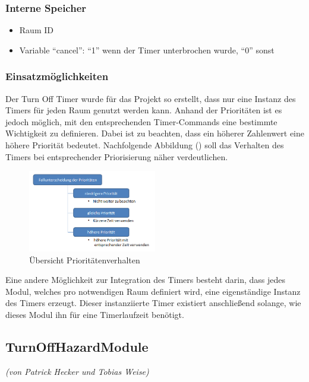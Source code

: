 \subsubsection{Interne Speicher}
\begin{itemize}
	\item Raum ID
	\item Variable "`cancel"': "`1"' wenn der Timer unterbrochen wurde, "`0"' sonst
\end{itemize}

\subsubsection{Einsatzmöglichkeiten}
Der Turn Off Timer wurde für das Projekt so erstellt, dass nur eine Instanz des Timers für jeden Raum genutzt werden kann. Anhand der Prioritäten ist es jedoch möglich, mit den entsprechenden Timer-Commands eine bestimmte Wichtigkeit zu definieren. Dabei ist zu beachten, dass ein höherer Zahlenwert eine höhere Priorität bedeutet. Nachfolgende Abbildung () soll das Verhalten des Timers bei entsprechender Priorisierung näher verdeutlichen.

\begin{figure}[h!]
	\centering
	\includegraphics[width=0.5\textwidth]{img/Modulkonzeption/TurnOffTimer.png}
	\caption{Übersicht Prioritätenverhalten}
	\label{fig:turnOffTimer}
\end{figure}

Eine andere Möglichkeit zur Integration des Timers besteht darin, dass jedes Modul, welches pro notwendigen Raum definiert wird, eine eigenständige Instanz des Timers erzeugt. Dieser instanziierte Timer existiert anschließend solange, wie dieses Modul ihn für eine Timerlaufzeit benötigt.


\subsection{TurnOffHazardModule}
\emph{(von Patrick Hecker und Tobias Weise)}

